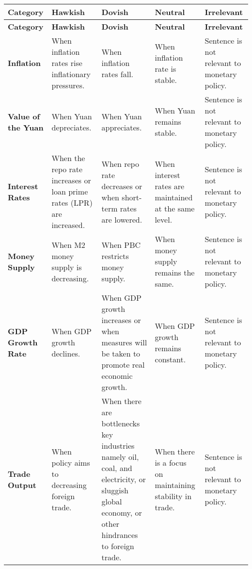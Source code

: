 \begin{longtable}{p{}p{}p{}p{}p{}}
\caption{} \label{tb:pboc_mp_stance_guide}\\
\toprule
\textbf{Category} & \textbf{Hawkish} & \textbf{Dovish} & \textbf{Neutral} & \textbf{Irrelevant} \\
\midrule
\endfirsthead

\toprule
\textbf{Category} & \textbf{Hawkish} & \textbf{Dovish} & \textbf{Neutral} & \textbf{Irrelevant} \\
\midrule
\endhead
\textbf{Inflation} & When inflation rates rise inflationary pressures. & When inflation rates fall. & When inflation rate is stable. & Sentence is not relevant to monetary policy. \\
\midrule
\textbf{Value of the Yuan} & When Yuan depreciates. & When Yuan appreciates. & When Yuan remains stable. & Sentence is not relevant to monetary policy. \\
\midrule
\textbf{Interest Rates} & When the repo rate increases or loan prime rates (LPR) are increased. & When repo rate decreases or when short-term rates are lowered. & When interest rates are maintained at the same level. & Sentence is not relevant to monetary policy. \\
\midrule
\textbf{Money Supply} & When M2 money supply is decreasing. & When PBC restricts money supply. & When money supply remains the same. & Sentence is not relevant to monetary policy. \\
\midrule
\textbf{GDP Growth Rate} & When GDP growth declines. & When GDP growth increases or when measures will be taken to promote real economic growth. & When GDP growth remains constant. & Sentence is not relevant to monetary policy. \\
\midrule
\textbf{Trade Output} & When policy aims to decreasing foreign trade. & When there are bottlenecks key industries namely oil, coal, and electricity, or sluggish global economy, or other hindrances to foreign trade. & When there is a focus on maintaining stability in trade. & Sentence is not relevant to monetary policy. \\
\bottomrule
\end{longtable}
